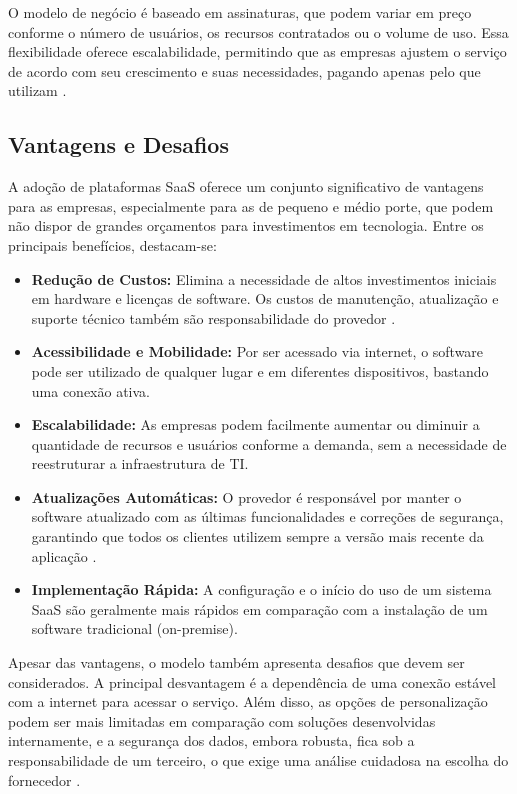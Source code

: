 O modelo de negócio é baseado em assinaturas, que podem variar em preço conforme o número de usuários, os recursos contratados ou o volume de uso. Essa flexibilidade oferece escalabilidade, permitindo que as empresas ajustem o serviço de acordo com seu crescimento e suas necessidades, pagando apenas pelo que utilizam \cite{prologapp2024}.

\subsection{Vantagens e Desafios}

A adoção de plataformas SaaS oferece um conjunto significativo de vantagens para as empresas, especialmente para as de pequeno e médio porte, que podem não dispor de grandes orçamentos para investimentos em tecnologia. Entre os principais benefícios, destacam-se:

\begin{itemize}
    \item \textbf{Redução de Custos:} Elimina a necessidade de altos investimentos iniciais em hardware e licenças de software. Os custos de manutenção, atualização e suporte técnico também são responsabilidade do provedor \cite{prologapp2024}.
    \item \textbf{Acessibilidade e Mobilidade:} Por ser acessado via internet, o software pode ser utilizado de qualquer lugar e em diferentes dispositivos, bastando uma conexão ativa.
    \item \textbf{Escalabilidade:} As empresas podem facilmente aumentar ou diminuir a quantidade de recursos e usuários conforme a demanda, sem a necessidade de reestruturar a infraestrutura de TI.
    \item \textbf{Atualizações Automáticas:} O provedor é responsável por manter o software atualizado com as últimas funcionalidades e correções de segurança, garantindo que todos os clientes utilizem sempre a versão mais recente da aplicação \cite{gestran2025saas}.
    \item \textbf{Implementação Rápida:} A configuração e o início do uso de um sistema SaaS são geralmente mais rápidos em comparação com a instalação de um software tradicional (on-premise).
\end{itemize}

Apesar das vantagens, o modelo também apresenta desafios que devem ser considerados. A principal desvantagem é a dependência de uma conexão estável com a internet para acessar o serviço. Além disso, as opções de personalização podem ser mais limitadas em comparação com soluções desenvolvidas internamente, e a segurança dos dados, embora robusta, fica sob a responsabilidade de um terceiro, o que exige uma análise cuidadosa na escolha do fornecedor \cite{agendor2025b2b}.

